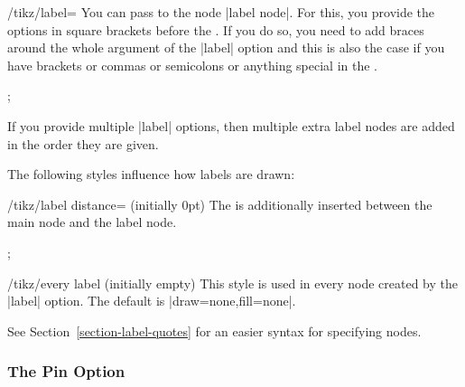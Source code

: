 \begin{key}{/tikz/label=}
  You can pass  to the node |label node|. For this, you
  provide the options in square brackets before the . If you
  do so, you need to add braces around the whole argument of the
  |label| option and this is also the case if you have brackets or
  commas or semicolons or anything special in the .
\begin{codeexample}[]
\tikz {};
\end{codeexample}

\begin{codeexample}[]
\end{codeexample}

  If you provide multiple |label| options, then multiple extra label
  nodes are added in the order they are given.

  The following styles influence how labels are drawn:
  \begin{key}{/tikz/label distance= (initially 0pt)}
    The  is additionally inserted between the main node
    and the label node.
\begin{codeexample}[]
\tikz[label distance=5mm]
  ;
\end{codeexample}
  \end{key}
  \begin{stylekey}{/tikz/every label (initially \normalfont empty)}
    This style is used in every node created by the |label|
    option. The default is |draw=none,fill=none|.
  \end{stylekey}
\end{key}

See Section~\ref{section-label-quotes} for an easier
syntax for specifying nodes.

\subsubsection{The Pin Option}

